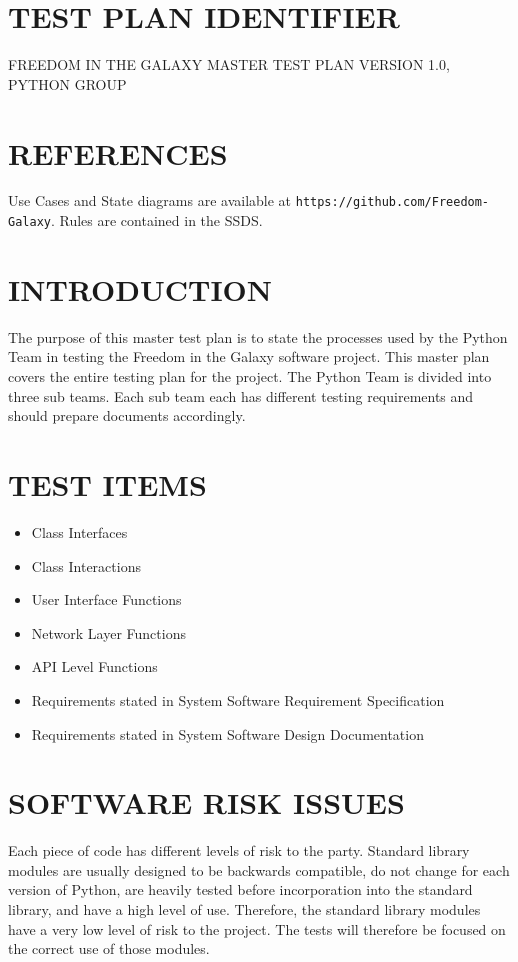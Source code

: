 \documentclass[report]{article}
\begin{document}
\section[IDENTIFIER]{TEST PLAN IDENTIFIER}
FREEDOM IN THE GALAXY MASTER TEST PLAN VERSION 1.0, PYTHON GROUP
\section[REFERENCES]{REFERENCES}
Use Cases and State diagrams are available at {\tt https://github.com/Freedom-Galaxy}. Rules are contained in the SSDS.


\section[INTRODUCTION]{INTRODUCTION}
The purpose of this master test plan is to state the processes used by the Python Team in testing the Freedom in the Galaxy software project. This master plan covers the entire testing plan for the project. The Python Team is divided into three sub teams. Each sub team each has different testing requirements and should prepare documents accordingly.

\section[TEST ITEMS]{TEST ITEMS}
\begin{itemize}
\item Class Interfaces
\item Class Interactions
\item User Interface Functions
\item Network Layer Functions
\item API Level Functions
\item Requirements stated in System Software Requirement Specification
\item Requirements stated in System Software Design Documentation
\end{itemize}

\section[SOFTWARE RISK ISSUES]{SOFTWARE RISK ISSUES}
\label{risk}
Each piece of code has different levels of risk to the party. Standard library modules are usually designed to be backwards compatible, do not change for each version of Python, are heavily tested before incorporation into the standard library, and have a high level of use. Therefore, the standard library modules have a very low level of risk to the project. The tests will therefore be focused on the correct use of those modules.
\end{document}
